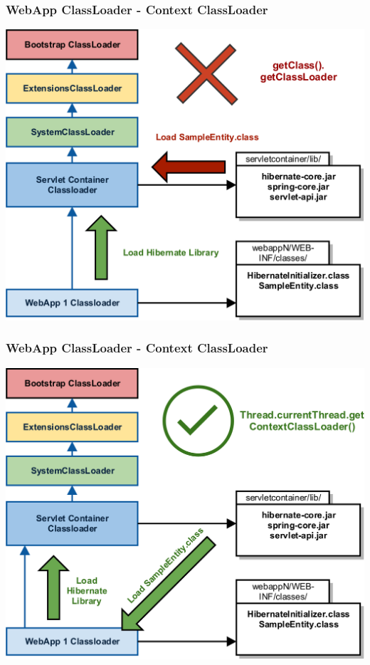 \documentclass[aspectratio=169]{beamer}
\begin{document}
	\begin{frame}
		\frametitle{WebApp ClassLoader - Context ClassLoader}
		\begin{center}
			\includegraphics[scale=0.1]{assets/contextclassloader/webappclassloader-2.png} 
		\end{center}
	\end{frame}
	\begin{frame}
		\frametitle{WebApp ClassLoader - Context ClassLoader}
		\begin{center}
			\includegraphics[scale=0.1]{assets/contextclassloader/webappclassloader-3.png} 
		\end{center}
	\end{frame}
\end{document}
